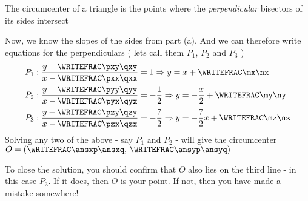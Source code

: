 \begin{parts}
\begin{solution}[\halfpage]
  	The circumcenter of a triangle is the points where the \textit{perpendicular} bisectors 
  	of its sides intersect
  	
  	Now, we know the slopes of the sides from part (a). And we can therefore write equations for 
    the perpendiculars ( lets call them $P_1,\, P_2$ and $P_3$ )
    \begin{align}
    	P_1: \dfrac{y-\WRITEFRAC\pxy\qxy}{x-\WRITEFRAC\pxx\qxx} &= 1 
    	\Rightarrow y = x + \WRITEFRAC\mx\nx \\
    	P_2: \dfrac{y-\WRITEFRAC\pyy\qyy}{x-\WRITEFRAC\pyx\qyx} &= -\frac{1}{2} 
    	\Rightarrow y = -\frac{x}{2} + \WRITEFRAC\my\ny \\
    	P_3: \dfrac{y-\WRITEFRAC\pzy\qzy}{x-\WRITEFRAC\pzx\qzx} &= -\frac{7}{2} 
    	\Rightarrow y = -\frac{7}{2}x + \WRITEFRAC\mz\nz
    \end{align}
    Solving any two of the above - say $P_1$ and $P_2$ - will give the circumcenter 
    $O = \left( \WRITEFRAC\ansxp\ansxq,\,\WRITEFRAC\ansyp\ansyq \right)$
    
    To close the solution, you should confirm that $O$ also lies on the third line - 
    in this case $P_3$. If it does, then $O$ is your point. If not, then you have made a mistake somewhere!
  \end{solution}

\end{parts}

